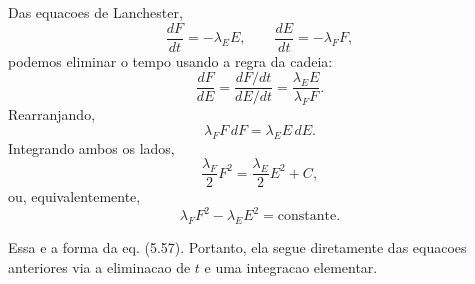 Das equacoes de Lanchester,
\[
\frac{dF}{dt}=-\lambda_EE,
\qquad
\frac{dE}{dt}=-\lambda_FF,
\]
podemos eliminar o tempo usando a regra da cadeia:
\[
\frac{dF}{dE}=\frac{dF/dt}{dE/dt}=\frac{\lambda_EE}{\lambda_FF}.
\]
Rearranjando,
\[
\lambda_FF\,dF=\lambda_EE\,dE.
\]
Integrando ambos os lados,
\[
\frac{\lambda_F}{2}F^2=\frac{\lambda_E}{2}E^2+C,
\]
ou, equivalentemente,
\[
\lambda_FF^2-\lambda_EE^2=\text{constante}.
\]

Essa e a forma da eq. (5.57). Portanto, ela segue diretamente das equacoes anteriores via a eliminacao de $t$ e uma integracao elementar.